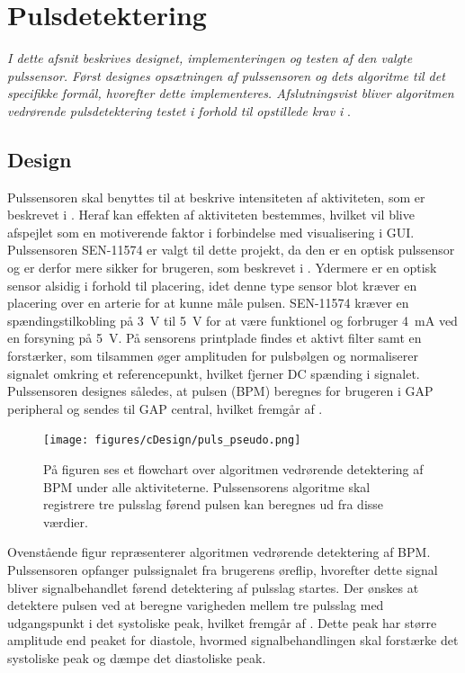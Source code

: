\section{Pulsdetektering}\label{sec_de_im_te_puls}
\textit{I dette afsnit beskrives designet, implementeringen og testen af den valgte pulssensor. Først designes opsætningen af pulssensoren og dets algoritme til det specifikke formål, hvorefter dette implementeres. Afslutningsvist bliver algoritmen vedrørende pulsdetektering testet i forhold til opstillede krav i }.

\subsection{Design} \label{sec_design_puls}
Pulssensoren skal benyttes til at beskrive intensiteten af aktiviteten, som er beskrevet i . Heraf kan effekten af aktiviteten bestemmes, hvilket vil blive afspejlet som en motiverende faktor i forbindelse med visualisering i GUI. \newline
Pulssensoren SEN-11574 er valgt til dette projekt, da den er en optisk pulssensor og er derfor mere sikker for brugeren, som beskrevet i . Ydermere er en optisk sensor alsidig i forhold til placering, idet denne type sensor blot kræver en placering over en arterie for at kunne måle pulsen. SEN-11574 kræver en spændingstilkobling på 3~V til 5~V for at være funktionel og forbruger 4~mA ved en forsyning på 5~V. På sensorens printplade findes et aktivt filter samt en forstærker, som tilsammen øger amplituden for pulsbølgen og normaliserer signalet omkring et referencepunkt, hvilket fjerner DC spænding i signalet. \citep{Murphy2016,Murphy2016_sensor}\\
Pulssensoren designes således, at pulsen (BPM) beregnes for brugeren i GAP peripheral og sendes til GAP central, hvilket fremgår af .
\begin{figure}[H]
	\centering
	\texttt{[image: figures/cDesign/puls\_pseudo.png]}
	\caption{På figuren ses et flowchart over algoritmen vedrørende detektering af BPM under alle aktiviteterne. Pulssensorens algoritme skal registrere tre pulsslag førend pulsen kan beregnes ud fra disse værdier.}
	\label{fig:puls_pseudo}
\end{figure}
Ovenstående figur repræsenterer algoritmen vedrørende detektering af BPM. Pulssensoren opfanger pulssignalet fra brugerens øreflip, hvorefter dette signal bliver signalbehandlet førend detektering af pulsslag startes. Der ønskes at detektere pulsen ved at beregne varigheden mellem tre pulsslag med udgangspunkt i det systoliske peak, hvilket fremgår af . Dette peak har større amplitude end peaket for diastole, hvormed signalbehandlingen skal forstærke det systoliske peak og dæmpe det diastoliske peak.  \\
